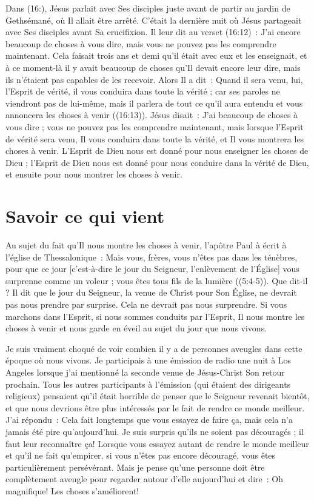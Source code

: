 Dans (16:), Jésus parlait avec Ses disciples juste avant
 de partir au jardin de Gethsémané, où Il allait être arrêté.
 C'était la dernière nuit où Jésus partageait avec Ses disciples
 avant Sa crucifixion.
 Il leur dit au verset (16:12)~:
 \og J'ai encore beaucoup de choses à vous dire,
 mais vous ne pouvez pas les comprendre maintenant. \fg{}
 Cela faisait trois ans et demi qu'il était avec eux et les enseignait,
 et à ce moment-là il y avait beaucoup de choses qu'Il devait encore
 leur dire, mais ils n'étaient pas capables de les recevoir.
 Alors Il a dit~: \og Quand il sera venu, lui, l'Esprit de vérité,
 il vous conduira dans toute la vérité ; car ses paroles ne viendront pas
 de lui-même, mais il parlera de tout ce qu'il aura entendu et vous annoncera
 les choses à venir \fg{} ((16:13)).
 Jésus disait~: \og J'ai beaucoup de choses à vous dire ; vous ne pouvez pas
 les comprendre maintenant, mais lorsque l'Esprit de vérité sera venu,
 Il vous conduira dans toute la vérité, et Il vous montrera les choses
 à venir. \fg{}
 L'Esprit de Dieu nous est donné pour nous enseigner les choses de Dieu ;
 l'Esprit de Dieu nous est donné pour nous conduire dans la vérité de Dieu,
 et ensuite pour nous montrer les choses à venir.


\section*{Savoir ce qui vient}

Au sujet du fait qu'Il nous montre les choses à venir,
 l'apôtre Paul à écrit à l'église de Thessalonique~:
 \og Mais vous, frères, vous n'êtes pas dans les ténèbres,
 pour que ce jour [c'est-à-dire le jour du Seigneur,
 l'enlèvement de l'Église] vous surprenne comme un voleur ;
 vous êtes tous fils de la lumière \fg{}
 ((5:4-5)).
 Que dit-il ? Il dit que le jour du Seigneur, la venue de Christ
 pour Son Église, ne devrait pas nous prendre par surprise.
 Cela ne devrait pas nous surprendre. Si vous marchons dans l'Esprit,
 si nous sommes conduits par l'Esprit, Il nous montre les choses à venir
 et nous garde en éveil au sujet du jour que nous vivons.

Je suis vraiment choqué de voir combien il y a de personnes aveu\-gles
 dans cette époque où nous vivons. Je participais à une émission de radio
 une nuit à Los Angeles lorsque j'ai mentionné la seconde venue
 de Jésus-Christ \ocadr Son retour prochain.
 Tous les autres participants à l'émission
 (qui étaient des dirigeants religieux) pensaient qu'il était horrible
 de penser que le Seigneur revenait bientôt, et que nous devrions être plus
 intéressés par le fait de rendre ce monde meilleur. J'ai répondu~:
 \og Cela fait longtemps que vous essayez de faire ça, mais cela n'a jamais
 été pire qu'aujourd'hui. \fg{}
 Je suis surpris qu'ils ne soient pas découragés ;
 il faut leur reconnaître ça!
 Lorsque vous essayez autant de rendre le monde meilleur et qu'il ne fait
 qu'empirer, si vous n'êtes pas encore découragé, vous êtes
 particulièrement persévérant.
 Mais je pense qu'une personne doit être complètement aveugle pour regarder
 autour d'elle aujourd'hui et dire~:
 \og Oh magnifique! Les choses s'améliorent! \fg{}

